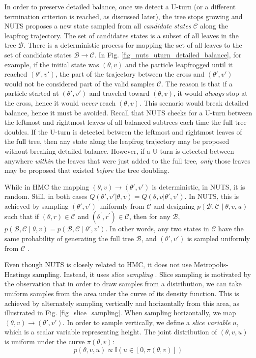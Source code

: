 \documentclass[12pt]{article}
\begin{document}
In order to preserve detailed balance, once we detect a U-turn (or a different termination criterion is reached, as discussed later), the tree stops growing and NUTS proposes a new state sampled from all \textit{candidate states} $\mathcal{C}$ along the leapfrog trajectory. The set of candidates states is a subset of all leaves in the tree $\mathcal{B}$. There is a deterministic process for mapping the set of all leaves to the set of candidate states $\mathcal{B} \rightarrow \mathcal{C}$. In Fig. \ref{fig_nuts_uturn_detailed_balance}, for example, if the initial state was $(\theta, v)$ and the particle leapfrogged until it reached $(\theta', v')$, the part of the trajectory between the cross and $(\theta', v')$ would not be considered part of the valid samples $\mathcal{C}$. The reason is that if a particle started at $(\theta', v')$ and traveled toward $(\theta, v)$, it would \textit{always} stop at the cross, hence it would \textit{never} reach $(\theta, v)$. This scenario would break detailed balance, hence it must be avoided. Recall that NUTS checks for a U-turn between the leftmost and rightmost leaves of all balanced subtrees each time the full tree doubles. If the U-turn is detected between the leftmost and rightmost leaves of the full tree, then any state along the leapfrog trajectory may be proposed without breaking detailed balance. However, if a U-turn is detected between anywhere \textit{within} the leaves that were just added to the full tree, \textit{only} those leaves may be proposed that existed \textit{before} the tree doubling.

While in HMC the mapping $(\theta, v) \rightarrow (\theta', v')$ is deterministic, in NUTS, it is random. Still, in both cases $Q(\theta', v'|\theta, v) = Q(\theta, v|\theta', v')$. In NUTS, this is achieved by sampling $(\theta', v')$ uniformly from $\mathcal{C}$ and designing $p(\mathcal{B}, \mathcal{C} \mid \theta, v, u)$ such that if $(\theta, r) \in \mathcal{C}$ and $\left(\theta^{\prime}, r^{\prime}\right) \in \mathcal{C}$, then for any $\mathcal{B}$, $p(\mathcal{B}, \mathcal{C} \mid \theta, v)=p(\mathcal{B}, \mathcal{C} \mid \theta', v')$. In other words, any two states in $\mathcal{C}$ have the same probability of generating the full tree $\mathcal{B}$, and $(\theta', v')$ is sampled uniformly from $\mathcal{C}$ .

Even though NUTS is closely related to HMC, it does not use Metropolis-Hastings sampling. Instead, it uses \textit{slice sampling} \cite{slice_sampling}. Slice sampling is motivated by the observation that in order to draw samples from a distribution, we can take uniform samples from the area under the curve of its density function. This is achieved by alternately sampling vertically and horizontally from this area, as illustrated in Fig. \ref{fig_slice_sampling}. When sampling horizontally, we map $(\theta, v) \rightarrow (\theta', v')$. In order to sample vertically, we define a \textit{slice variable} $u$, which is a scalar variable representing height. The joint distribution of $(\theta, v, u)$ is uniform under the curve $\pi(\theta, v)$:
\begin{equation}
p(\theta, v, u) \propto \mathbb{I}\left(u \in\left[0, \pi(\theta, v) \right]\right)
\end{equation}
\end{document}
